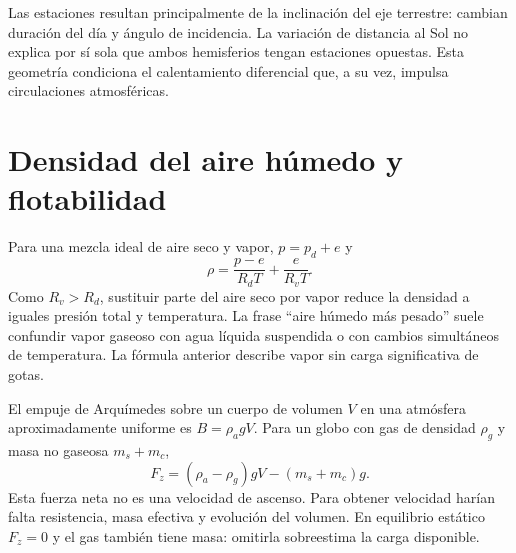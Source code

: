 Las estaciones resultan principalmente de la inclinación del eje terrestre: cambian duración del día y ángulo de incidencia. La variación de distancia al Sol no explica por sí sola que ambos hemisferios tengan estaciones opuestas. Esta geometría condiciona el calentamiento diferencial que, a su vez, impulsa circulaciones atmosféricas.

\section{Densidad del aire húmedo y flotabilidad}
Para una mezcla ideal de aire seco y vapor, $p=p_d+e$ y
\begin{equation}
 \rho=\frac{p-e}{R_dT}+\frac{e}{R_vT}.
\end{equation}
Como $R_v>R_d$, sustituir parte del aire seco por vapor reduce la densidad a iguales presión total y temperatura. La frase ``aire húmedo más pesado'' suele confundir vapor gaseoso con agua líquida suspendida o con cambios simultáneos de temperatura. La fórmula anterior describe vapor sin carga significativa de gotas.

El empuje de Arquímedes sobre un cuerpo de volumen $V$ en una atmósfera aproximadamente uniforme es $B=\rho_a gV$. Para un globo con gas de densidad $\rho_g$ y masa no gaseosa $m_s+m_c$,
\begin{equation}\label{eq:03-globo}
 F_z=(\rho_a-\rho_g)gV-(m_s+m_c)g.
\end{equation}
Esta fuerza neta no es una velocidad de ascenso. Para obtener velocidad harían falta resistencia, masa efectiva y evolución del volumen. En equilibrio estático $F_z=0$ y el gas también tiene masa: omitirla sobreestima la carga disponible.

